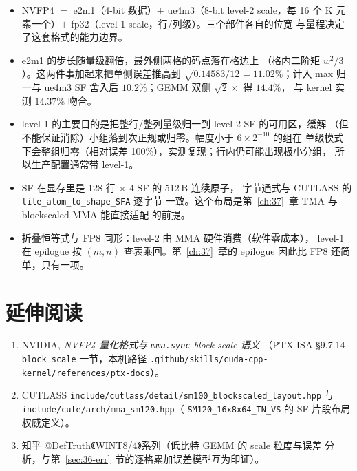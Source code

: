\begin{itemize}[itemsep=2pt,topsep=3pt]
  \item NVFP4 $=$ e2m1（4-bit 数据）$+$ ue4m3（8-bit level-2 scale，每 16 个
        K 元素一个）$+$ fp32（level-1 scale，行/列级）。三个部件各自的位宽
        与量程决定了这套格式的能力边界。
  \item e2m1 的步长随量级翻倍，最外侧两格的码点落在格边上
        （格内二阶矩 $w^2/3$）。这两件事加起来把单侧误差推高到
        $\sqrt{0.14583/12}=11.02\%$；计入 max 归一与 ue4m3 SF 舍入后
        $10.2\%$；GEMM 双侧 $\sqrt2\times$ 得 $\mathbf{14.4\%}$，
        与 kernel 实测 $14.37\%$ 吻合。
  \item level-1 的主要目的是把整行/整列量级归一到 level-2 SF 的可用区，缓解
        （但不能保证消除）小组落到次正规或归零。幅度小于 $6\times2^{-10}$ 的组在
        单级模式下会整组归零（相对误差 100\%），实测复现；行内仍可能出现极小分组，
        所以生产配置通常带 level-1。
  \item SF 在显存里是 128 行 $\times$ 4 SF 的 512\,B 连续原子，
        字节通式与 CUTLASS 的 \texttt{tile\_atom\_to\_shape\_SFA} 逐字节
        一致。这个布局是第~\ref{ch:37}~章 TMA 与 blockscaled MMA 能直接适配
        的前提。
  \item 折叠恒等式与 FP8 同形：level-2 由 MMA 硬件消费（软件零成本），
        level-1 在 epilogue 按 $(m,n)$ 查表乘回。第~\ref{ch:37}~章的
        epilogue 因此比 FP8 还简单，只有一项。
\end{itemize}

\section*{延伸阅读}

\begin{enumerate}[itemsep=2pt,topsep=3pt]
  \item NVIDIA, \emph{NVFP4 量化格式与 \texttt{mma.sync} block scale 语义}
        （PTX ISA \S9.7.14 \texttt{block\_scale} 一节，本机路径
        \texttt{.github/\allowbreak skills/\allowbreak cuda-cpp-kernel/\allowbreak references/\allowbreak ptx-docs}）。
  \item CUTLASS \texttt{include/\allowbreak cutlass/\allowbreak detail/\allowbreak sm100\_blockscaled\_layout.hpp}
        与 \texttt{include/\allowbreak cute/\allowbreak arch/\allowbreak mma\_sm120.hpp}（
        \texttt{SM120\_16x8x64\_TN\_VS} 的 SF 片段布局权威定义）。
  \item 知乎 @DefTruth《WINT8/4》系列（低比特 GEMM 的 scale 粒度与误差
        分析，与第~\ref{sec:36-err}~节的逐格累加误差模型互为印证）。
\end{enumerate}
